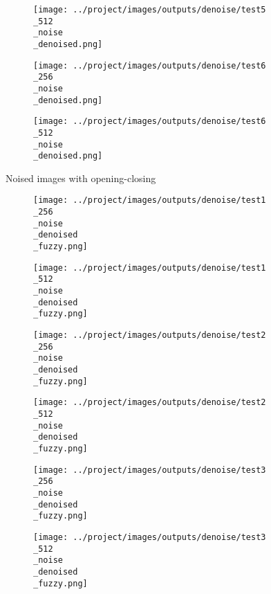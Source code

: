 \begin{figure}[!ht]
\begin{subfigure}[t]{0.15\textwidth}
    \texttt{[image: ../project/images/outputs/denoise/test5\\\_512\\\_noise\\\_denoised.png]}
    \caption{}
    \centering
  \end{subfigure}
\begin{subfigure}[t]{0.15\textwidth}
    \texttt{[image: ../project/images/outputs/denoise/test6\\\_256\\\_noise\\\_denoised.png]}
    \caption{}
    \centering
  \end{subfigure}
\begin{subfigure}[t]{0.15\textwidth}
    \texttt{[image: ../project/images/outputs/denoise/test6\\\_512\\\_noise\\\_denoised.png]}
    \caption{}
    \centering
  \end{subfigure}
 \caption{Noised images with opening-closing}
 \end{figure}
\begin{figure}[!ht]
   \centering
\begin{subfigure}[t]{0.15\textwidth}
    \texttt{[image: ../project/images/outputs/denoise/test1\\\_256\\\_noise\\\_denoised\\\_fuzzy.png]}
    \caption{}
    \centering
  \end{subfigure}
\begin{subfigure}[t]{0.15\textwidth}
    \texttt{[image: ../project/images/outputs/denoise/test1\\\_512\\\_noise\\\_denoised\\\_fuzzy.png]}
    \caption{}
    \centering
  \end{subfigure}
\begin{subfigure}[t]{0.15\textwidth}
    \texttt{[image: ../project/images/outputs/denoise/test2\\\_256\\\_noise\\\_denoised\\\_fuzzy.png]}
    \caption{}
    \centering
  \end{subfigure}
\begin{subfigure}[t]{0.15\textwidth}
    \texttt{[image: ../project/images/outputs/denoise/test2\\\_512\\\_noise\\\_denoised\\\_fuzzy.png]}
    \caption{}
    \centering
  \end{subfigure}
\begin{subfigure}[t]{0.15\textwidth}
    \texttt{[image: ../project/images/outputs/denoise/test3\\\_256\\\_noise\\\_denoised\\\_fuzzy.png]}
    \caption{}
    \centering
  \end{subfigure}
\begin{subfigure}[t]{0.15\textwidth}
    \texttt{[image: ../project/images/outputs/denoise/test3\\\_512\\\_noise\\\_denoised\\\_fuzzy.png]}
    \caption{}
    \centering
  \end{subfigure}

\end{figure}

